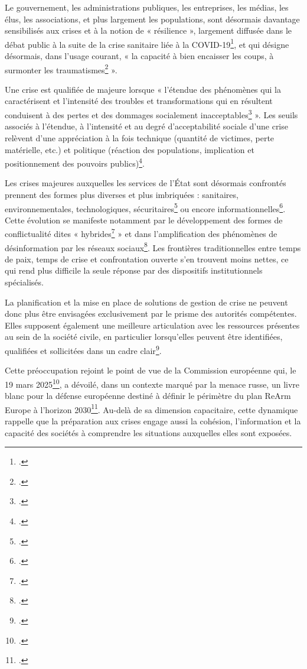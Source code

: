 Le gouvernement, les administrations publiques, les entreprises, les médias, les élus, les associations, et plus largement les populations, sont désormais davantage sensibilisés aux crises et à la notion de « résilience », largement diffusée dans le débat public à la suite de la crise sanitaire liée à la COVID-19\footcite{Paries2020_resilience_covid19}, et qui désigne désormais, dans l'usage courant, « la capacité à bien encaisser les coups, à surmonter les traumatismes\footcite[1]{Paries2020_resilience_covid19} ».

Une crise est qualifiée de majeure lorsque « l'étendue des phénomènes qui la caractérisent et l'intensité des troubles et transformations qui en résultent conduisent à des pertes et des dommages socialement inacceptables\footcite{info_pompiers_crise_majeure_def} ». Les seuils associés à l'étendue, à l'intensité et au degré d'acceptabilité sociale d'une crise relèvent d'une appréciation à la fois technique (quantité de victimes, perte matérielle, etc.) et politique (réaction des populations, implication et positionnement des pouvoirs publics)\footcite{info_pompiers_crise_majeure_def}.

Les crises majeures auxquelles les services de l'État sont désormais confrontés prennent des formes plus diverses et plus imbriquées : sanitaires, environnementales, technologiques, sécuritaires\footcite{AN:2022:Resilience_nationale} ou encore informationnelles\footcite[3]{SciencesPo:2025:Resilience_menaces_informationnelles}.
Cette évolution se manifeste notamment par le développement des formes de conflictualité dites « hybrides\footcite{tenenbaum2016guerre} » et dans l'amplification des phénomènes de désinformation par les réseaux sociaux\footcite{garrigou2025desinformation}. Les frontières traditionnelles entre temps de paix, temps de crise et confrontation ouverte s'en trouvent moins nettes, ce qui rend plus difficile la seule réponse par des dispositifs institutionnels spécialisés.

La planification et la mise en place de solutions de gestion de crise ne peuvent donc plus être envisagées exclusivement par le prisme des autorités compétentes. Elles supposent également une meilleure articulation avec les ressources présentes au sein de la société civile, en particulier lorsqu'elles peuvent être identifiées, qualifiées et sollicitées dans un cadre clair\footcite{AN:2022:Resilience_nationale}.

\clearpage

Cette préoccupation rejoint le point de vue de la Commission européenne qui, le 19 mars 2025\footcite{burgdorff2025livreblanc}, a dévoilé, dans un contexte marqué par la menace russe, un livre blanc pour la défense européenne destiné à définir le périmètre du plan ReArm Europe à l'horizon 2030\footcite{viepublique2025livreblanc}. Au-delà de sa dimension capacitaire, cette dynamique rappelle que la préparation aux crises engage aussi la cohésion, l'information et la capacité des sociétés à comprendre les situations auxquelles elles sont exposées.

